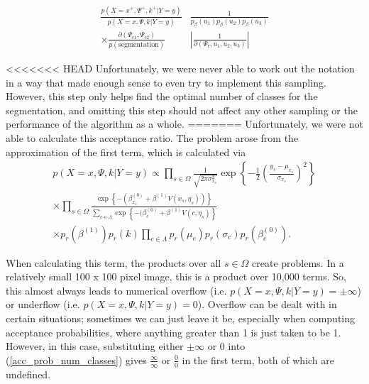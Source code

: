 \documentclass[11pt]{article}
\begin{document}
\begin{equation}\label{acc_prob_num_classes}
\begin{aligned}
\frac{p\left(X=x^{+}, \Psi^{+}, k^{+} | Y=y\right)}{p(X=x, \Psi, k | Y=y)} & \frac{1}{p_{\beta}\left(u_{1}\right) p_{\beta}\left(u_{2}\right) p_{\beta}\left(u_{3}\right)} \\
\times \frac{\partial\left(\Psi_{c 1}, \Psi_{c 2}\right)}{p(\text {segmentation})} &\left|\frac{1}{\partial\left(\Psi_{c}, u_{1}, u_{2}, u_{3}\right)}\right|
\end{aligned}
\end{equation}

<<<<<<< HEAD
Unfortunately, we were never able to work out the notation in a way that made enough sense to even try to implement this sampling.
However, this step only helps find the optimal number of classes for the segmentation, and omitting this step should not affect any other sampling or the performance of the algorithm as a whole.
=======
Unfortunately, we were not able to calculate this acceptance ratio.
The problem arose from the approximation of the first term, which is calculated via
\begin{equation}
\begin{aligned}
   p(X=x, \Psi, k | Y = y) \propto \prod_{s \in \Omega}  \frac{1}{\sqrt{2 \pi \sigma_{x_s}^2}} \exp \left \{ -\frac{1}{2} \left( \frac{y_s - \mu_{x_s} }{ \sigma_{x_s}}\right)^2  \right \} \\
   \times \prod_{s \in \Omega} \frac{\exp \left \{ - \left(\beta_{x_s}^{(0)} + \beta^{(1)} V(x_s, \eta_s) \right)  \right \} }{\sum_{c \in \Lambda} \exp \left \{ -(\beta^{(0)}_c + \beta^{(1)} V(c, \eta_s)  \right \}} \\
   \times p_r\left(\beta^{(1)}\right) p_r(k) \prod_{c \in \Lambda} p_r (\mu_c) p_r ( \sigma_c ) p_r (\beta_c^{(0)}).
\end{aligned}
\end{equation}

When calculating this term, the products over all $ s \in \Omega $ create problems.
In a relatively small 100 x 100 pixel image, this is a product over 10,000 terms.
So, this almost always leads to numerical overflow (i.e. $p(X=x, \Psi, k | Y = y) = \pm \infty $) or underflow (i.e. $ p(X=x, \Psi, k | Y = y) = 0$).
Overflow can be dealt with in certain situations; sometimes we can just leave it be, especially when computing acceptance probabilities, where anything greater than 1 is just taken to be 1.
However, in this case, substituting either $\pm\infty$ or $ 0 $ into (\ref{acc_prob_num_classes}) gives $ \frac{\infty}{\infty} $ or $ \frac{0}{0} $ in the first term, both of which are undefined.
\end{document}
